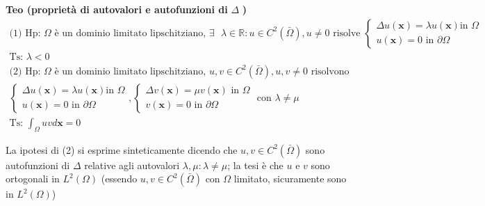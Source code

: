 \documentclass{article}
\begin{document}
\textbf{Teo (propriet\`{a} di autovalori e autofunzioni di }$\Delta $\textbf{%
)} 
\begin{gather*}
\text{(1) Hp: }\Omega \text{ \`{e} un dominio limitato lipschitziano, }%
\exists \text{ }\lambda \in 
\mathbb{R}
:u\in C^{2}\left( \bar{\Omega}\right) ,u\neq 0\text{ risolve }\left\{ 
\begin{array}{c}
\Delta u\left( \mathbf{x}\right) =\lambda u\left( \mathbf{x}\right) \text{
in }\Omega \\ 
u\left( \mathbf{x}\right) =0\text{ in }\partial \Omega%
\end{array}%
\right. \\
\text{Ts: }\lambda <0 \\
\text{(2) Hp: }\Omega \text{ \`{e} un dominio limitato lipschitziano, }%
u,v\in C^{2}\left( \bar{\Omega}\right) ,u,v\neq 0\text{ risolvono } \\
\left\{ 
\begin{array}{c}
\Delta u\left( \mathbf{x}\right) =\lambda u\left( \mathbf{x}\right) \text{
in }\Omega \\ 
u\left( \mathbf{x}\right) =0\text{ in }\partial \Omega%
\end{array}%
\right. ,\left\{ 
\begin{array}{c}
\Delta v\left( \mathbf{x}\right) =\mu v\left( \mathbf{x}\right) \text{ in }%
\Omega \\ 
v\left( \mathbf{x}\right) =0\text{ in }\partial \Omega%
\end{array}%
\right. \text{ con }\lambda \neq \mu \\
\text{Ts: }\int_{\Omega }uvd\mathbf{x}=0
\end{gather*}

La ipotesi di (2) si esprime sinteticamente dicendo che $u,v\in C^{2}\left( 
\bar{\Omega}\right) $ sono autofunzioni di $\Delta $ relative agli
autovalori $\lambda ,\mu :\lambda \neq \mu $; la tesi \`{e} che $u$ e $v$
sono ortogonali in $L^{2}\left( \Omega \right) $ (essendo $u,v\in
C^{2}\left( \bar{\Omega}\right) $ con $\Omega $ limitato, sicuramente sono
in $L^{2}\left( \Omega \right) $)
\end{document}
